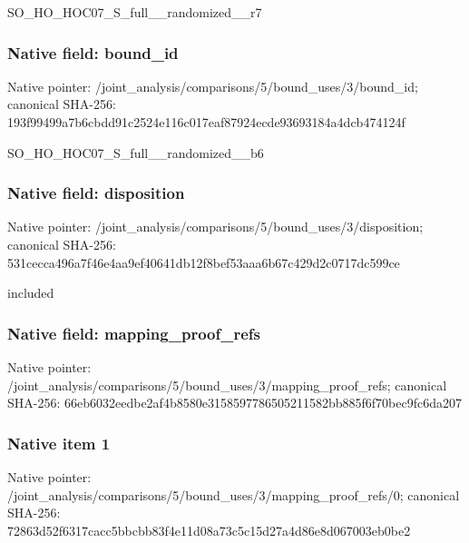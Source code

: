 \documentclass[10pt,a4paper]{article}
\begin{document}
\begingroup\raggedright\sloppy SO\_\allowbreak{}HO\_\allowbreak{}HOC07\_\allowbreak{}S\_\allowbreak{}full\_\allowbreak{}\_\allowbreak{}randomized\_\allowbreak{}\_\allowbreak{}r7\par\endgroup

\subsubsection{Native field: bound\_\allowbreak{}id}
Native pointer: /joint\_\allowbreak{}analysis/comparisons/5/bound\_\allowbreak{}uses/3/bound\_\allowbreak{}id; canonical SHA-256: 193f99499a7b6cbdd91c2524e116c017eaf87924ecde93693184a4dcb474124f

\begingroup\raggedright\sloppy SO\_\allowbreak{}HO\_\allowbreak{}HOC07\_\allowbreak{}S\_\allowbreak{}full\_\allowbreak{}\_\allowbreak{}randomized\_\allowbreak{}\_\allowbreak{}b6\par\endgroup

\subsubsection{Native field: disposition}
Native pointer: /joint\_\allowbreak{}analysis/comparisons/5/bound\_\allowbreak{}uses/3/disposition; canonical SHA-256: 531cecca496a7f46e4aa9ef40641db12f8bef53aaa6b67c429d2c0717dc599ce

\begingroup\raggedright\sloppy included\par\endgroup

\subsubsection{Native field: mapping\_\allowbreak{}proof\_\allowbreak{}refs}
Native pointer: /joint\_\allowbreak{}analysis/comparisons/5/bound\_\allowbreak{}uses/3/mapping\_\allowbreak{}proof\_\allowbreak{}refs; canonical SHA-256: 66eb6032eedbe2af4b8580e3158597786505211582bb885f6f70bec9fc6da207

\subsubsection{Native item 1}
Native pointer: /joint\_\allowbreak{}analysis/comparisons/5/bound\_\allowbreak{}uses/3/mapping\_\allowbreak{}proof\_\allowbreak{}refs/0; canonical SHA-256: 72863d52f6317cacc5bbcbb83f4e11d08a73c5c15d27a4d86e8d067003eb0be2
\end{document}
